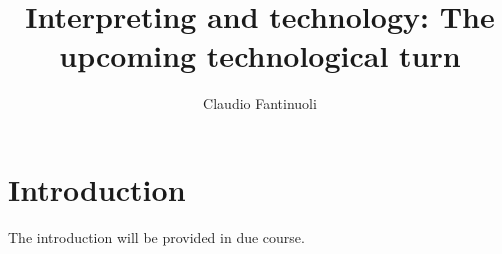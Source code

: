 \documentclass[output=paper]{langsci/langscibook}
\title{Interpreting and technology: The upcoming technological turn}
\author{Claudio Fantinuoli\affiliation{University of Mainz}}
\begin{document}
\maketitle


 

 
\section{Introduction}

The introduction will be provided in due course.
\sloppy
\printbibliography[heading=subbibliography,notkeyword=this]
\end{document}
